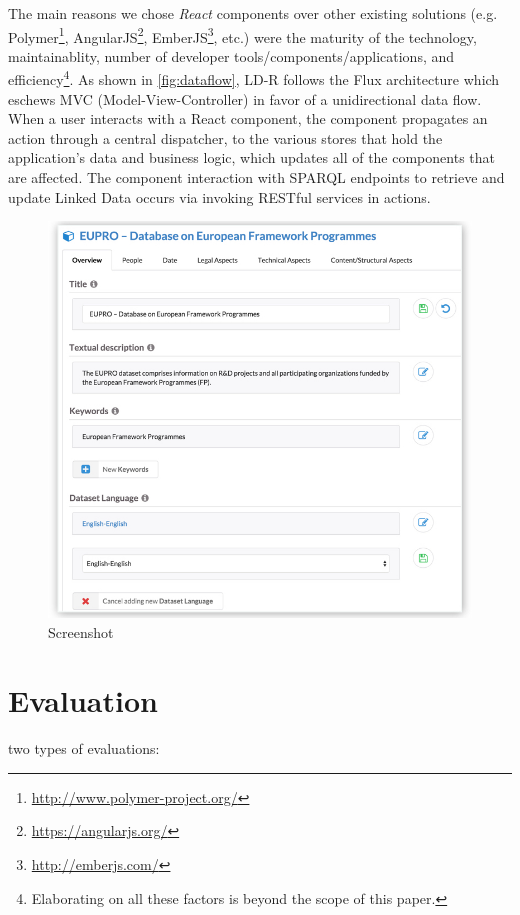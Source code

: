 \documentclass{acm_proc_article-sp}
\begin{document}
The main reasons we chose \emph{React} components over other existing solutions (e.g. Polymer\footnote{\url{http://www.polymer-project.org/}}, AngularJS\footnote{\url{https://angularjs.org/}}, EmberJS\footnote{\url{http://emberjs.com/}}, etc.) were the maturity of the technology, maintainablity, number of developer tools/components/applications, and efficiency\footnote{Elaborating on all these factors is beyond the scope of this paper.}.
As shown in \autoref{fig:dataflow}, LD-R follows the Flux architecture which eschews MVC (Model-View-Controller) in favor of a unidirectional data flow. 
When a user interacts with a React component, the component propagates an action through a central dispatcher, to the various stores that hold the application's data and business logic, which updates all of the components that are affected. 
The component interaction with SPARQL endpoints to retrieve and update Linked Data occurs via invoking RESTful services in actions.




\begin{figure}[tb]
  \includegraphics[width=.9\linewidth]{images/screenshot.jpg}
  \caption{Screenshot}
\end{figure}

\section{Evaluation}

two types of evaluations:
\end{document}
